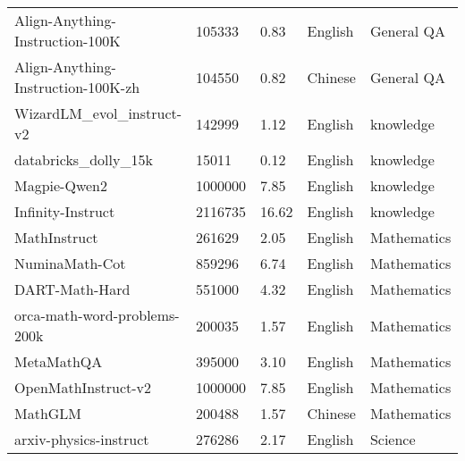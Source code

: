 \begin{table}[h]
\begin{tabular}{l|l|l|l|l}
Align-Anything-Instruction-100K~\cite{ji2024align}    & 105333  & 0.83     & English  & General QA   \\
Align-Anything-Instruction-100K-zh~\cite{ji2024align} & 104550  & 0.82     & Chinese  & General QA   \\
WizardLM\_evol\_instruct-v2~\cite{xu2024wizardlm}        & 142999  & 1.12     & English  & knowledge    \\
databricks\_dolly\_15k~\cite{DatabricksBlog2023DollyV2}             & 15011   & 0.12     & English  & knowledge    \\
Magpie-Qwen2~\cite{xu2024magpie}                       & 1000000 & 7.85     & English  & knowledge    \\
Infinity-Instruct~\cite{InfinityInstruct2024}                  & 2116735 & 16.62    & English  & knowledge    \\
MathInstruct~\cite{yue2023mammoth}                       & 261629  & 2.05     & English  & Mathematics  \\
NuminaMath-Cot~\cite{numina_math_datasets}                     & 859296  & 6.74     & English  & Mathematics  \\
DART-Math-Hard~\cite{tong2024dartmath}                     & 551000  & 4.32     & English  & Mathematics  \\
orca-math-word-problems-200k~\cite{mitra2024orcamath}       & 200035  & 1.57     & English  & Mathematics  \\
MetaMathQA~\cite{yu2023metamath}                         & 395000  & 3.10      & English  & Mathematics  \\
OpenMathInstruct-v2~\cite{toshniwal2024openmath2}                & 1000000 & 7.85     & English  & Mathematics  \\
MathGLM~\cite{yang2023gpt}                            & 200488  & 1.57     & Chinese  & Mathematics  \\
arxiv-physics-instruct~\cite{phi-arxiv-physics-instruct}             & 276286  & 2.17     & English  & Science      \\
\bottomrule
\end{tabular}
\end{table}


